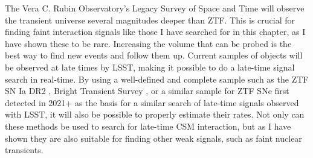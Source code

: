 \documentclass[a4paper,oneside,12pt, class=Latex/Classes/PhDthesisPSnPDF, crop=false]{standalone}
\begin{document}
The Vera C. Rubin Observatory's Legacy Survey of Space and Time \cite[LSST;][]{LSST} will observe the transient universe several magnitudes deeper than ZTF. This is crucial for finding faint interaction signals like those I have searched for in this chapter, as I have shown these to be rare. Increasing the volume that can be probed is the best way to find new events and follow them up. Current samples of objects will be observed at late times by LSST, making it possible to do a late-time signal search in real-time. By using a well-defined and complete sample such as the ZTF SN Ia DR2 \citep[][, Smith et al.~in prep.]{DR2_Overview}, Bright Transient Survey \cite[BTS;][]{BTS_I, BTS_II}, or a similar sample for ZTF SNe first detected in 2021+ as the basis for a similar search of late-time signals observed with LSST, it will also be possible to properly estimate their rates. Not only can these methods be used to search for late-time CSM interaction, but as I have shown they are also suitable for finding other weak signals, such as faint nuclear transients.
\end{document}

